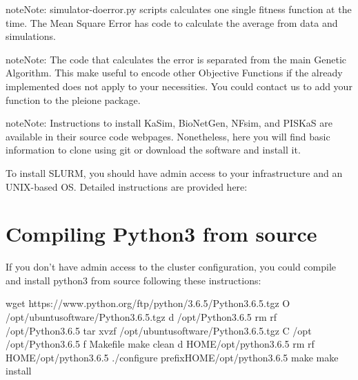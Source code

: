 \documentclass[letterpaper,10pt,english]{sphinxmanual}
\begin{document}
\begin{sphinxadmonition}{note}{Note:}
simulator-doerror.py scripts calculates one single fitness function at the time.
The Mean Square Error has code to calculate the average from data and simulations.
\end{sphinxadmonition}

\begin{sphinxadmonition}{note}{Note:}
The code that calculates the error is separated from the main Genetic
Algorithm. This make useful to encode other Objective Functions if the
already implemented does not apply to your necessities. You could contact us
to add your function to the pleione package.
\end{sphinxadmonition}

\begin{sphinxadmonition}{note}{Note:}
Instructions to install KaSim, BioNetGen, NFsim, and PISKaS are
available in their source code webpages. Nonetheless, here you will find
basic information to clone using git or download the software and install
it.

To install SLURM, you should have admin access to your infrastructure and an
UNIX-based OS. Detailed instructions are provided here:
{\hyperref[\detokenize{SLURM:slurm-instructions}]{}}
\end{sphinxadmonition}


\chapter{Compiling Python3 from source}
\label{\detokenize{Python3:compiling-python3-from-source}}\label{\detokenize{Python3::doc}}
If you don’t have admin access to the cluster configuration, you could compile
and install python3 from source following these instructions:

%
\begin{sphinxVerbatim}[commandchars=\\\{\}]
wget https://www.python.org/ftp/python/3.6.5/Python\PYGZhy{}3.6.5.tgz 
\PYGZhy{}O \PYGZti{}/opt/ubuntu\PYGZhy{}software/Python\PYGZhy{}3.6.5.tgz
 \PYG{o}{[} \PYGZhy{}d \PYGZti{}/opt/Python\PYGZhy{}3.6.5 \PYG{o}{]}  rm \PYGZhy{}rf \PYGZti{}/opt/Python\PYGZhy{}3.6.5 
tar xvzf \PYGZti{}/opt/ubuntu\PYGZhy{}software/Python\PYGZhy{}3.6.5.tgz \PYGZhy{}C \PYGZti{}/opt
 \PYGZti{}/opt/Python\PYGZhy{}3.6.5
 \PYG{o}{[} \PYGZhy{}f Makefile \PYG{o}{]}  make clean 
 \PYG{o}{[} \PYGZhy{}d HOME/opt/python\PYGZhy{}3.6.5 \PYG{o}{]}  rm \PYGZhy{}rf HOME/opt/python\PYGZhy{}3.6.5 
./configure \PYGZhy{}\PYGZhy{}prefixHOME/opt/python\PYGZhy{}3.6.5
make
make install
\end{sphinxVerbatim}
\end{document}
